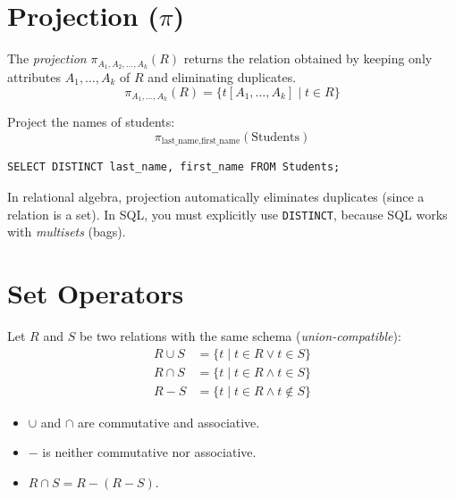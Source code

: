\section{Projection ($\pi$)}

\begin{definition}[Projection]
The \emph{projection} $\pi_{A_1, A_2, \ldots, A_k}(R)$ returns the relation
obtained by keeping only attributes $A_1, \ldots, A_k$ of $R$ and
eliminating duplicates.
\[
\pi_{A_1, \ldots, A_k}(R) = \{ t[A_1, \ldots, A_k] \mid t \in R \}
\]
\end{definition}

\begin{example}
Project the names of students:
\[
\pi_{\text{last\_name}, \text{first\_name}}(\text{Students})
\]

\begin{codeblock}[title=\textbf{SQL Equivalent of Projection}]
\begin{verbatim}
SELECT DISTINCT last_name, first_name FROM Students;
\end{verbatim}
\end{codeblock}
\end{example}

\begin{warning}[title=\textbf{Projection and Duplicates}]
In relational algebra, projection automatically eliminates duplicates
(since a relation is a set). In SQL, you must explicitly use \texttt{DISTINCT},
because SQL works with \emph{multisets} (bags).
\end{warning}

\section{Set Operators}

\begin{definition}
Let $R$ and $S$ be two relations with the same schema (\emph{union-compatible}):
\begin{align}
R \cup S &= \{ t \mid t \in R \lor t \in S \} \tag{union}\\
R \cap S &= \{ t \mid t \in R \land t \in S \} \tag{intersection}\\
R - S &= \{ t \mid t \in R \land t \notin S \} \tag{difference}
\end{align}
\end{definition}

\begin{theorem}
\begin{itemize}
    \item $\cup$ and $\cap$ are commutative and associative.
    \item $-$ is neither commutative nor associative.
    \item $R \cap S = R - (R - S)$.
\end{itemize}
\end{theorem}

